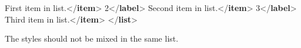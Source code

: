 \documentclass[11pt,twoside]{article}\makeatletter
\begin{document}
\begin{shaded}
First item in list.{</\textbf{item}>}\mbox{}\newline 
{}2{</\textbf{label}>}\mbox{}\newline 
{}Second item in list.{</\textbf{item}>}\mbox{}\newline 
{}3{</\textbf{label}>}\mbox{}\newline 
{}Third item in list.{</\textbf{item}>}\mbox{}\newline 
{</\textbf{list}>}\end{shaded}\egroup\par \noindent  The styles should not be mixed in the same list.\par
\end{document}
